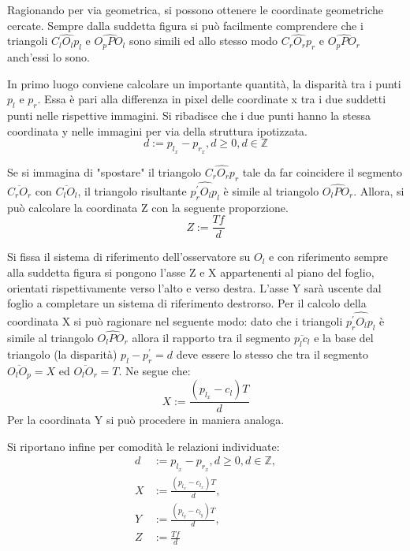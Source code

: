 Ragionando per via geometrica, si possono ottenere le coordinate geometriche cercate. Sempre dalla suddetta figura si può facilmente comprendere che i triangoli  $\widehat{C_lO_lp_l}$ e $\widehat{O_pPO_l}$ sono simili ed allo stesso modo $\widehat{C_rO_rp_r}$ e $\widehat{O_pPO_r}$ anch'essi lo sono. 

In primo luogo conviene calcolare un importante quantità, la disparità tra i punti $p_l$ e $p_r$. Essa è pari alla differenza in pixel delle coordinate x  tra i due suddetti punti nelle rispettive immagini. Si ribadisce che i due punti hanno la stessa coordinata y nelle immagini per via della struttura ipotizzata.
\begin{equation}
	d := p_{l_x} - p_{r_x}, d \ge 0, d \in \mathbb{Z}
\end{equation}

Se si immagina di "spostare" il triangolo $\widehat{C_rO_rp_r}$ tale da far coincidere il segmento $\overline{C_rO_r}$ con $\overline{C_lO_l}$, il triangolo risultante $\widehat{p_r^{'}O_lp_l}$ è simile al triangolo $\widehat{O_lPO_r}$. Allora, si può calcolare la coordinata Z con la seguente proporzione.
\begin{equation}
\label{eq:stimaZ}
Z := \frac{Tf}{d}
\end{equation}

Si fissa il sistema di riferimento dell'osservatore su $O_l$ e con riferimento sempre alla suddetta figura si pongono l'asse Z e X appartenenti al piano del foglio, orientati rispettivamente verso l'alto e verso destra. L'asse Y sarà uscente dal foglio a completare un sistema di riferimento destrorso. 
Per il calcolo della coordinata X si può ragionare nel seguente modo: dato che i triangoli $\widehat{p_r^{'}O_lp_l}$ è simile al triangolo $\widehat{O_lPO_r}$ allora il rapporto tra il segmento $\overline{p_lc_l}$ e la base del triangolo (la disparità) $p_l - p_r^{'} = d$ deve essere lo stesso che tra il segmento $\overline{O_lO_p} = X$ ed $\overline{O_lO_r} = T$. Ne segue che:
\begin{equation}
	X := \frac{(p_{l_x} - c_l) T}{d}
\end{equation}
Per la coordinata Y si può procedere in maniera analoga.

Si riportano infine per comodità le relazioni individuate:
\begin{align}
	d &:= p_{l_x} - p_{r_x}, d \ge 0, d \in \mathbb{Z},\\
	X &:= \frac{(p_{l_x} - c_{l_x}) T}{d},\\
	Y &:= \frac{(p_{l_y} - c_{l_y}) T}{d},\\
	Z &:= \frac{Tf}{d}
\end{align}

